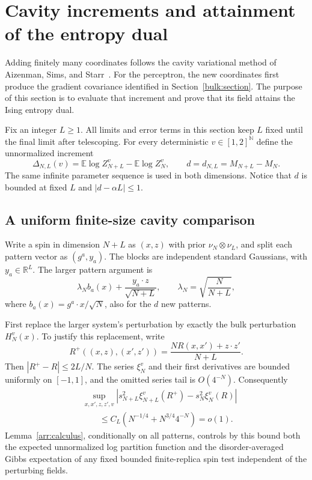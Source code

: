 \section{Cavity increments and attainment of the entropy dual}
\label{cav:section}

Adding finitely many coordinates follows the cavity variational method of
Aizenman, Sims, and Starr~\cite{aizenmansimsstarr2003}. For the perceptron,
the new coordinates first produce the gradient covariance identified in
Section~\ref{bulk:section}. The purpose of this section is to evaluate that
increment and prove that its field attains the Ising entropy dual.

Fix an integer $L\ge1$. All limits and error terms in this section keep
$L$ fixed until the final limit after telescoping. For every deterministic
$v\in[1,2]^{\mathbb N}$ define the unnormalized increment
\begin{equation}\label{cav:increment-definition}
 \Delta_{N,L}(v)=\mathbb E\log Z_{N+L}^v-\mathbb E\log Z_N^v,
 \qquad d=d_{N,L}=M_{N+L}-M_N.
\end{equation}
The same infinite parameter sequence is used in both dimensions.
Notice that $d$ is bounded at fixed $L$ and $|d-\alpha L|\le1$.

\subsection{A uniform finite-size cavity comparison}

Write a spin in dimension $N+L$ as $(x,z)$ with prior
$\nu_N\otimes\nu_L$, and split each pattern vector as $(g^a,y_a)$.
The blocks are independent standard Gaussians, with $y_a\in\mathbb R^L$.
The larger pattern argument is
\[
 \lambda_N b_a(x)+\frac{y_a\cdot z}{\sqrt{N+L}},
 \qquad \lambda_N=\sqrt{\frac{N}{N+L}},
\]
where $b_a(x)=g^a\cdot x/\sqrt N$, also for the $d$ new patterns.

First replace the larger system's perturbation by exactly the bulk
perturbation $H_N^v(x)$.  To justify this replacement, write
\[
 R^+((x,z),(x',z'))=\frac{NR(x,x')+z\cdot z'}{N+L}.
\]
Then $|R^+-R|\le2L/N$.  The series
$\xi_N^v$ and their first derivatives are bounded uniformly on
$[-1,1]$, and the omitted series tail is $O(4^{-N})$.  Consequently
\begin{align}
 &\sup_{x,x',z,z',v}
 \left|s_{N+L}^2\xi_{N+L}^v(R^+)-s_N^2\xi_N^v(R)\right|
 \nonumber\\
 &\qquad\le C_L\left(N^{-1/4}+N^{3/4}4^{-N}\right)=o(1).
 \label{cav:perturbation-comparison}
\end{align}
Lemma~\ref{arr:calculus}, conditionally on all patterns, controls by
this bound both the expected unnormalized log partition function and
the disorder-averaged Gibbs expectation of any fixed bounded
finite-replica spin test independent of the perturbing fields.


